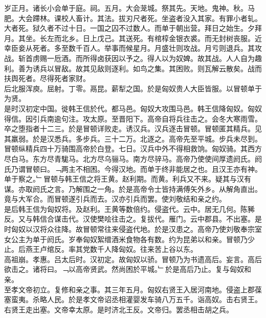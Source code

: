 \documentclass{zhvt-classic}
\begin{document}
\hspace*{2em}岁正月。诸长小会单于庭。祠。五月。大会茏城。祭其先。天地。鬼神。秋。马肥。大会蹛林。课校人畜计。其法。拔刃尺者死。坐盗者没入其家。有罪小者轧。大者死。狱久者不过十日。一国之囚不过数人。而单于朝出营。拜日之始生。夕拜月。其坐。长左而北乡。日上戊己。其送死。有棺椁金银衣裘。而无封树丧服。近幸臣妾从死者。多至数千百人。举事而候星月。月盛壮则攻战。月亏则退兵。其攻战。斩首虏赐一卮酒。而所得卤获因以予之。得人以为奴婢。故其战。人人自为趣利。善为诱兵以冒敌。故其见敌则逐利。如鸟之集。其困败。则瓦解云散矣。战而扶舆死者。尽得死者家财。\\
\hspace*{2em}后北服浑庾。屈射。丁零。鬲昆。薪犁之国。於是匈奴贵人大臣皆服。以冒顿单于为贤。\\
\hspace*{2em}是时汉初定中国。徙韩王信於代。都马邑。匈奴大攻围马邑。韩王信降匈奴。匈奴得信。因引兵南逾句注。攻太原。至晋阳下。高帝自将兵往击之。会冬大寒雨雪。卒之堕指者十二三。於是冒顿详败走。诱汉兵。汉兵逐击冒顿。冒顿匿其精兵。见其羸弱。於是汉悉兵。多步兵。三十二万。北逐之。高帝先至平城。步兵未尽到。冒顿纵精兵四十万骑围高帝於白登。七日。汉兵中外不得相救饷。匈奴骑。其西方尽白马。东方尽青駹马。北方尽乌骊马。南方尽骍马。高帝乃使使间厚遗阏氏。阏氏乃谓冒顿曰。﹁两主不相困。今得汉地。而单于终非能居之也。且汉王亦有神。单于察之。﹂冒顿与韩王信之将王黄。赵利期。而黄。利兵又不来。疑其与汉有谋。亦取阏氏之言。乃解围之一角。於是高帝令士皆持满傅矢外乡。从解角直出。竟与大军合。而冒顿遂引兵而去。汉亦引兵而罢。使刘敬结和亲之约。\\
\hspace*{2em}是后韩王信为匈奴将。及赵利。王黄等数倍约。侵盗代。云中。居无几何。陈豨反。又与韩信合谋击代。汉使樊哙往击之。复拔代。雁门。云中郡县。不出塞。是时匈奴以汉将众往降。故冒顿常往来侵盗代地。於是汉患之。高帝乃使刘敬奉宗室女公主为单于阏氏。岁奉匈奴絮缯酒米食物各有数。约为昆弟以和亲。冒顿乃少止。后燕王卢绾反。率其党数千人降匈奴。往来苦上谷以东。\\
\hspace*{2em}高祖崩。孝惠。吕太后时。汉初定。故匈奴以骄。冒顿乃为书遗高后。妄言。高后欲击之。诸将曰。﹁以高帝贤武。然尚困於平城。﹂於是高后乃止。复与匈奴和亲。\\
\hspace*{2em}至孝文帝初立。复修和亲之事。其三年五月。匈奴右贤王入居河南地。侵盗上郡葆塞蛮夷。杀略人民。於是孝文帝诏丞相灌婴发车骑八万五千。诣高奴。击右贤王。右贤王走出塞。文帝幸太原。是时济北王反。文帝归。罢丞相击胡之兵。\\
\end{document}
